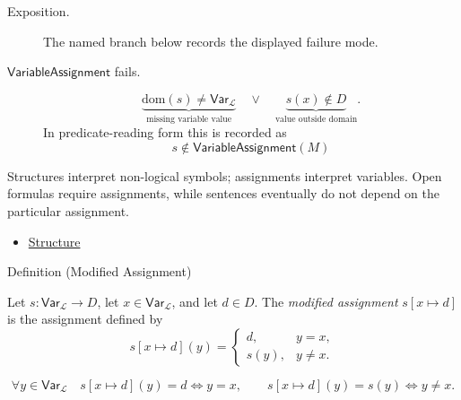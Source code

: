\begin{remark*}
\begin{description}
  \item[Exposition.] The named branch below records the displayed failure mode.
\item[\(\mathsf{VariableAssignment}\) fails.] \[
\underbrace{\mathrm{dom}(s)\neq\mathsf{Var}_{\mathcal L}}_{\text{missing variable value}}
\quad\lor\quad
\underbrace{s(x)\notin D}_{\text{value outside domain}}.
\]
  In predicate-reading form this is recorded as
  \[
    s\notin\mathsf{VariableAssignment}(M)
  \]
\end{description}
\end{remark*}

\begin{remark*}[Interpretation]
Structures interpret non-logical symbols; assignments interpret variables.
Open formulas require assignments, while sentences eventually do not depend on
the particular assignment.
\end{remark*}

\begin{dependencies}
\begin{itemize}
  \item \hyperref[def:structure]{Structure}
\end{itemize}
\end{dependencies}

\begin{definitionbox}{Definition (Modified Assignment)}
\begin{definition}
\label{def:mod-assign}
Let \(s:\mathsf{Var}_{\mathcal L}\to D\), let \(x\in\mathsf{Var}_{\mathcal L}\),
and let \(d\in D\). The \emph{modified assignment} \(s[x\mapsto d]\) is the
assignment defined by
\[
s[x\mapsto d](y)=
\begin{cases}
d, & y=x,\\
s(y), & y\neq x.
\end{cases}
\]
\end{definition}
\end{definitionbox}

\begin{remark*}
\[
\forall y\in\mathsf{Var}_{\mathcal L}\quad
s[x\mapsto d](y)=d \Longleftrightarrow y=x,
\qquad
s[x\mapsto d](y)=s(y) \Longleftrightarrow y\neq x.
\]
\end{remark*}

